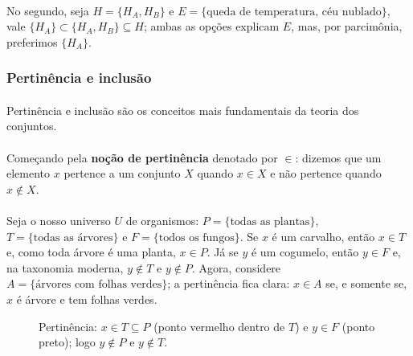 \documentclass[12pt,a4paper]{article}
\begin{document}
\paragraph{}
No segundo, seja \(H=\{H_A, H_B\}\) e \(E=\{\text{queda de temperatura},\, \text{céu nublado}\}\), vale \(\{H_A\} \subset \{H_A,H_B\} \subseteq H\); ambas as opções explicam \(E\), mas, 
por parcimônia, preferimos \(\{H_A\}\).

\subsubsection{Pertinência e inclusão}
\paragraph{}

Pertinência e inclusão são os conceitos mais fundamentais da teoria dos conjuntos. 

\paragraph{}
Começando pela \textbf{noção de pertinência} denotado por \(\in\): dizemos que um elemento \(x\) pertence a um conjunto \(X\) quando \(x \in X\) e não pertence quando \(x \notin X\).

\paragraph{}
Seja o nosso universo \(U\) de organismos: \(P=\{\text{todas as plantas}\}\), \(T=\{\text{todas as árvores}\}\) e \(F=\{\text{todos os fungos}\}\). Se \(x\) é um carvalho, então \(x\in T\) e, como toda árvore é uma planta, \(x\in P\). Já se \(y\) é um cogumelo, então \(y\in F\) e, na taxonomia moderna, \(y\notin T\) e \(y\notin P\). Agora, considere \(A=\{\text{árvores com folhas verdes}\}\); a pertinência fica clara: \(x\in A\) se, e somente se, \(x\) é árvore e tem folhas verdes.

\begin{figure}[htbp]
    \centering
    \caption{Pertinência: $x\in T\subseteq P$ (ponto vermelho dentro de $T$) e $y\in F$ (ponto preto); logo $y\notin P$ e $y\notin T$.}
    \label{fig:pertinencia}
\end{figure}
\end{document}
